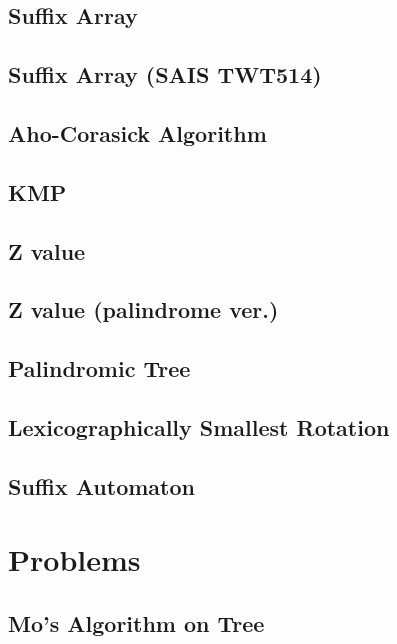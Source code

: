 \documentclass[a4paper,10pt,twocolumn,oneside]{article}
\begin{document}
\subsection{Suffix Array}

\subsection{Suffix Array (SAIS TWT514)}

\subsection{Aho-Corasick Algorithm}

\subsection{KMP}

\subsection{Z value}

\subsection{Z value (palindrome ver.)}

\subsection{Palindromic Tree}

\subsection{Lexicographically Smallest Rotation}

\subsection{Suffix Automaton}


\section{Problems}
\subsection{Mo's Algorithm on Tree}

\end{document}
